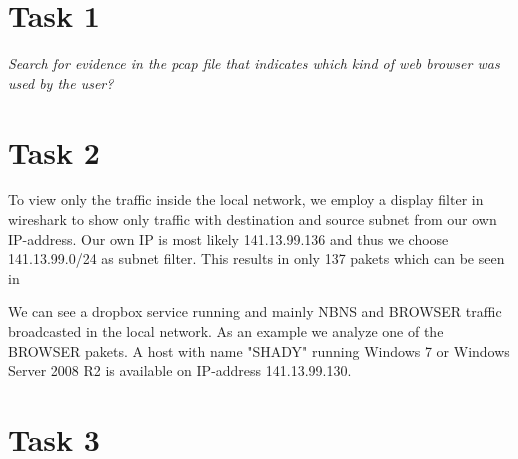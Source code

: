\documentclass[12pt]{article}
\begin{document}
\maketitle


\section{Task 1}\label{task1}
\emph{Search for evidence in the pcap file that indicates which kind of web browser was
used by the user?}


\section{Task 2}\label{task2}
To view only the traffic inside the local network, we employ a display filter in wireshark to show only traffic with destination and source subnet from our own IP-address. Our own IP is most likely 141.13.99.136 and thus we choose 141.13.99.0/24 as subnet filter. This results in only 137 pakets which can be seen in %


We can see a dropbox service running and mainly NBNS and BROWSER traffic broadcasted in the local network. As an example we analyze one of the BROWSER pakets. %
A host with name "SHADY" running Windows 7 or Windows Server 2008 R2 is available on IP-address 141.13.99.130.


\section{Task 3}\label{task3}
\end{document}
